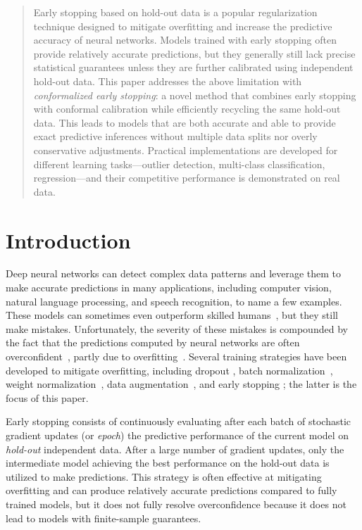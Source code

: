 \begin{abstract}
Early stopping based on hold-out data is a popular regularization technique designed to mitigate overfitting and increase the predictive accuracy of neural networks. Models trained with early stopping often provide relatively accurate predictions, but they generally still lack precise statistical guarantees unless they are further calibrated using independent hold-out data. This paper addresses the above limitation with {\em conformalized early stopping}: a novel method that combines early stopping with conformal calibration while efficiently recycling the same hold-out data. This leads to models that are both accurate and able to provide exact predictive inferences without multiple data splits nor overly conservative adjustments. Practical implementations are developed for different learning tasks---outlier detection, multi-class classification, regression---and their competitive performance is demonstrated on real data.
\end{abstract}


\section{Introduction}

Deep neural networks can detect complex data patterns and leverage them to make accurate predictions in many applications, including computer vision, natural language processing, and speech recognition, to name a few examples.
These models can sometimes even outperform skilled humans~\cite{silver2016mastering}, but they still make mistakes.
Unfortunately, the severity of these mistakes is compounded by the fact that the predictions computed by neural networks are often overconfident~\cite{guo2017calibration}, partly due to overfitting~\citep{thulasidasan2019mixup,ovadia2019can}.
Several training strategies have been developed to mitigate overfitting, including dropout \citep{srivastava2014dropout}, batch normalization~\cite{ioffe2015batch}, weight normalization~\cite{salimans2016weight}, data augmentation~\cite{shorten2019survey}, and early stopping \citep{PRECHELT1997}; the latter is the focus of this paper.

Early stopping consists of continuously evaluating after each batch of stochastic gradient updates (or {\em epoch}) the predictive performance of the current model on {\em hold-out} independent data.
After a large number of gradient updates, only the intermediate model achieving the best performance on the hold-out data is utilized to make predictions.
This strategy is often effective at mitigating overfitting and can produce relatively accurate predictions compared to fully trained models, but it does not fully resolve overconfidence because it does not lead to models with finite-sample guarantees.

